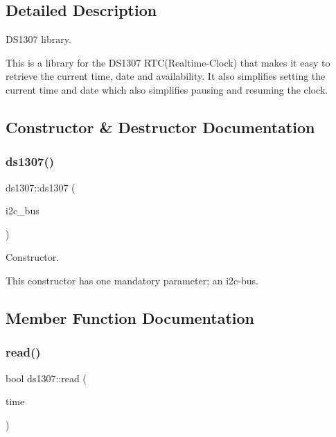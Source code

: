 \subsection{Detailed Description}
D\+S1307 library. 

This is a library for the D\+S1307 R\+TC(Realtime-\/\+Clock) that makes it easy to retrieve the current time, date and availability. It also simplifies setting the current time and date which also simplifies pausing and resuming the clock. 

\subsection{Constructor \& Destructor Documentation}
\mbox{\label{classds1307_af00b5a28de3652828671373f44cf7472}} 
\subsubsection{\texorpdfstring{ds1307()}{ds1307()}}
{\footnotesize\ttfamily ds1307\+::ds1307 (\begin{DoxyParamCaption}\item[{hwlib\+::i2c\+\_\+bus\+\_\+bit\+\_\+banged\+\_\+scl\+\_\+sda \&}]{i2c\+\_\+bus }\end{DoxyParamCaption})\hspace{0.3cm}{\ttfamily [inline]}}



Constructor. 

This constructor has one mandatory parameter; an i2c-\/bus. 

\subsection{Member Function Documentation}
\mbox{\label{classds1307_a7b3ffbaccd65aca8caa241a7fc243849}} 
\subsubsection{\texorpdfstring{read()}{read()}}
{\footnotesize\ttfamily bool ds1307\+::read (\begin{DoxyParamCaption}\item[{\hyperlink{structclockData}{clock\+Data} \&}]{time }\end{DoxyParamCaption})\hspace{0.3cm}{\ttfamily [inline]}}



